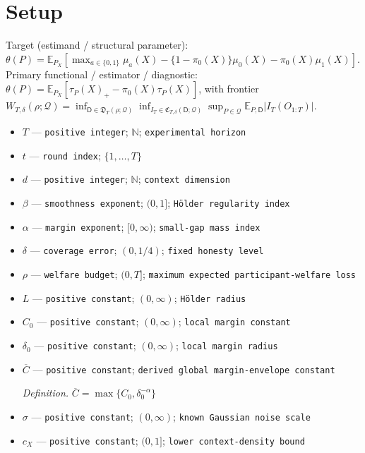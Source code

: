 \documentclass{article}
\begin{document}
\section{Setup}

Target (estimand / structural parameter): \(\theta(P)=\mathbb E_{P_X}[\max_{a\in\{0,1\}}\mu_a(X)-\{1-\pi_0(X)\}\mu_0(X)-\pi_0(X)\mu_1(X)]\).
Primary functional / estimator / diagnostic: \(\theta(P)=\mathbb E_{P_X}[\tau_P(X)_+-\pi_0(X)\tau_P(X)]\), with frontier \(W_{T,\delta}(\rho;\mathcal Q)=\inf_{\mathsf D\in\mathfrak D_T(\rho;\mathcal Q)}\inf_{I_T\in\mathfrak C_{T,\delta}(\mathsf D;\mathcal Q)}\sup_{P\in\mathcal Q}\mathbb E_{P,\mathsf D}|I_T(O_{1:T})|\).
\begin{itemize}
  \item \(T\) --- \texttt{positive integer}; \(\mathbb N\); \texttt{experimental horizon}
  \item \(t\) --- \texttt{round index}; \(\{1,\ldots,T\}\)
  \item \(d\) --- \texttt{positive integer}; \(\mathbb N\); \texttt{context dimension}
  \item \(\beta\) --- \texttt{smoothness exponent}; \((0,1]\); \texttt{Hölder regularity index}
  \item \(\alpha\) --- \texttt{margin exponent}; \([0,\infty)\); \texttt{small-\allowbreak{}gap mass index}
  \item \(\delta\) --- \texttt{coverage error}; \((0,1/4)\); \texttt{fixed honesty level}
  \item \(\rho\) --- \texttt{welfare budget}; \((0,T]\); \texttt{maximum expected participant-\allowbreak{}welfare loss}
  \item \(L\) --- \texttt{positive constant}; \((0,\infty)\); \texttt{Hölder radius}
  \item \(C_0\) --- \texttt{positive constant}; \((0,\infty)\); \texttt{local margin constant}
  \item \(\delta_0\) --- \texttt{positive constant}; \((0,\infty)\); \texttt{local margin radius}
  \item \(\overline C\) --- \texttt{positive constant}; \texttt{derived global margin-\allowbreak{}envelope constant}
  \par\smallskip\noindent\emph{Definition.} \(\overline C=\max\{C_0,\delta_0^{-\alpha}\}\)
  \item \(\sigma\) --- \texttt{positive constant}; \((0,\infty)\); \texttt{known Gaussian noise scale}
  \item \(c_X\) --- \texttt{positive constant}; \((0,1]\); \texttt{lower context-\allowbreak{}density bound}

\end{itemize}
\end{document}
